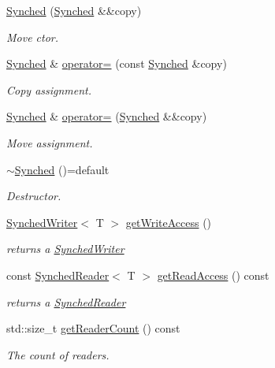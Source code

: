 \begin{DoxyCompactItemize}
\hyperlink{classttl_1_1_synched_a647dfd353e18d2986cf210db056af49c}{Synched} (\hyperlink{classttl_1_1_synched}{Synched} \&\&copy)
\begin{DoxyCompactList}\small\item\em Move ctor. \end{DoxyCompactList}\item 
\hyperlink{classttl_1_1_synched}{Synched} \& \hyperlink{classttl_1_1_synched_ae7dbfca4dc7944c22b408bf191c90786}{operator=} (const \hyperlink{classttl_1_1_synched}{Synched} \&copy)
\begin{DoxyCompactList}\small\item\em Copy assignment. \end{DoxyCompactList}\item 
\hyperlink{classttl_1_1_synched}{Synched} \& \hyperlink{classttl_1_1_synched_a21494a85d6afe4c47cc640acee86c6d4}{operator=} (\hyperlink{classttl_1_1_synched}{Synched} \&\&copy)
\begin{DoxyCompactList}\small\item\em Move assignment. \end{DoxyCompactList}\item 
\hyperlink{classttl_1_1_synched_ac8f8ec455e4fcfdabb0dc75d516e79ec}{$\sim$\-Synched} ()=default
\begin{DoxyCompactList}\small\item\em Destructor. \end{DoxyCompactList}\item 
\hyperlink{classttl_1_1_synched_writer}{Synched\-Writer}$<$ T $>$ \hyperlink{classttl_1_1_synched_a913a8d279fad4d94649dee596278a3dd}{get\-Write\-Access} ()
\begin{DoxyCompactList}\small\item\em returns a \hyperlink{classttl_1_1_synched_writer}{Synched\-Writer} \end{DoxyCompactList}\item 
const \hyperlink{classttl_1_1_synched_reader}{Synched\-Reader}$<$ T $>$ \hyperlink{classttl_1_1_synched_a88e58e2776f408481de37ae8ce89c6b1}{get\-Read\-Access} () const 
\begin{DoxyCompactList}\small\item\em returns a \hyperlink{classttl_1_1_synched_reader}{Synched\-Reader} \end{DoxyCompactList}\item 
std\-::size\-\_\-t \hyperlink{classttl_1_1_synched_aa6694d8a6541730ea80a8844c4d267e3}{get\-Reader\-Count} () const 
\begin{DoxyCompactList}\small\item\em The count of readers. \end{DoxyCompactList}\end{DoxyCompactItemize}



